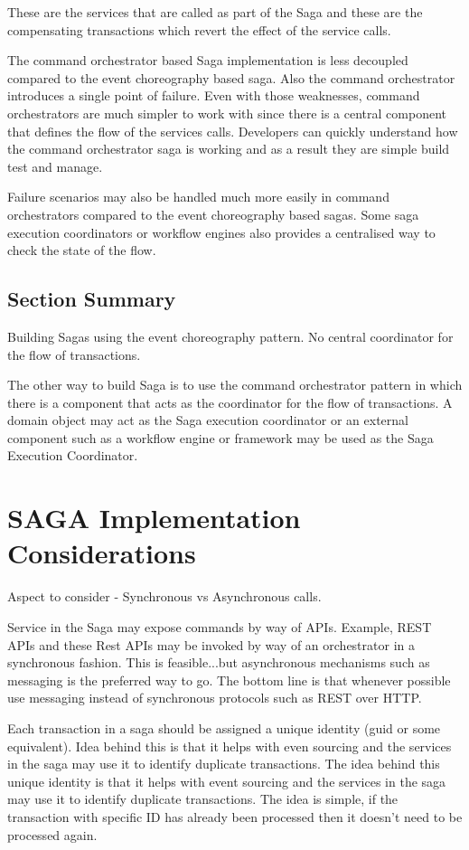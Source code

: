 \documentclass[a4paper, 11pt]{book}
\begin{document}
    These are the services that are called as part of the Saga and these are the compensating transactions which revert the effect of the service calls.

    The command orchestrator based Saga implementation is less decoupled compared to the event choreography based saga.
    Also the command orchestrator introduces a single point of failure.
    Even with those weaknesses, command orchestrators are much simpler to work with since there is a central component that defines the flow of the services calls.
    Developers can quickly understand how the command orchestrator saga is working and as a result they are simple build test and manage.

    Failure scenarios may also be handled much more easily in command orchestrators compared to the event choreography based sagas.
    Some saga execution coordinators or workflow engines also provides a centralised way to check the state of the flow.

    \subsection{Section Summary}
    Building Sagas using the event choreography pattern.
    No central coordinator for the flow of transactions.

    The other way to build Saga is to use the command orchestrator pattern in which there is a component that acts as the coordinator for the flow of transactions.
    A domain object may act as the Saga execution coordinator or an external component such as a workflow engine or framework may be used as the Saga Execution Coordinator.

    \section{SAGA Implementation Considerations}
    Aspect to consider - Synchronous vs Asynchronous calls.

    Service in the Saga may expose commands by way of APIs. Example, REST APIs and these Rest APIs may be invoked by way of an orchestrator in a synchronous fashion.
    This is feasible...but asynchronous mechanisms such as messaging is the preferred way to go.
    The bottom line is that whenever possible use messaging instead of synchronous protocols such as REST over HTTP.

    Each transaction in a saga should be assigned a unique identity (guid or some equivalent).
    Idea behind this is that it helps with even sourcing and the services in the saga may use it to identify duplicate transactions.
    The idea behind this unique identity is that it helps with event sourcing and the services in the saga may use it to identify duplicate transactions.
    The idea is simple, if the transaction with specific ID has already been processed then it doesn't need to be processed again.
\end{document}
